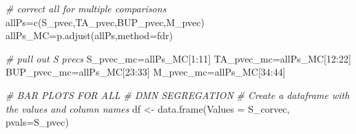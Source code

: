 \documentclass[
]{article}
\newenvironment{Shaded}{\begin{snugshade}}{\end{snugshade}}
\newcommand{\AttributeTok}[1]{\textcolor[rgb]{0.77,0.63,0.00}{#1}}
\newcommand{\CommentTok}[1]{\textcolor[rgb]{0.56,0.35,0.01}{\textit{#1}}}
\newcommand{\DecValTok}[1]{\textcolor[rgb]{0.00,0.00,0.81}{#1}}
\newcommand{\FunctionTok}[1]{\textcolor[rgb]{0.00,0.00,0.00}{#1}}
\newcommand{\NormalTok}[1]{#1}
\newcommand{\OtherTok}[1]{\textcolor[rgb]{0.56,0.35,0.01}{#1}}
\newcommand{\SpecialCharTok}[1]{\textcolor[rgb]{0.00,0.00,0.00}{#1}}
\newcommand{\StringTok}[1]{\textcolor[rgb]{0.31,0.60,0.02}{#1}}
\begin{document}
\begin{Shaded}
\begin{Highlighting}[]
\CommentTok{\# correct all for multiple comparisons}
\NormalTok{allPs}\OtherTok{=}\FunctionTok{c}\NormalTok{(S\_pvec,TA\_pvec,BUP\_pvec,M\_pvec)}
\NormalTok{allPs\_MC}\OtherTok{=}\FunctionTok{p.adjust}\NormalTok{(allPs,}\AttributeTok{method=}\StringTok{\textquotesingle{}fdr\textquotesingle{}}\NormalTok{)}

\CommentTok{\# pull out S pvecs}
\NormalTok{S\_pvec\_mc}\OtherTok{=}\NormalTok{allPs\_MC[}\DecValTok{1}\SpecialCharTok{:}\DecValTok{11}\NormalTok{]}
\NormalTok{TA\_pvec\_mc}\OtherTok{=}\NormalTok{allPs\_MC[}\DecValTok{12}\SpecialCharTok{:}\DecValTok{22}\NormalTok{]}
\NormalTok{BUP\_pvec\_mc}\OtherTok{=}\NormalTok{allPs\_MC[}\DecValTok{23}\SpecialCharTok{:}\DecValTok{33}\NormalTok{]}
\NormalTok{M\_pvec\_mc}\OtherTok{=}\NormalTok{allPs\_MC[}\DecValTok{34}\SpecialCharTok{:}\DecValTok{44}\NormalTok{]}

\CommentTok{\# BAR PLOTS FOR ALL}
\CommentTok{\# DMN SEGREGATION}
\CommentTok{\# Create a dataframe with the values and column names}
\NormalTok{df }\OtherTok{\textless{}{-}} \FunctionTok{data.frame}\NormalTok{(}\AttributeTok{Values =}\NormalTok{ S\_corvec, }\AttributeTok{pvals=}\NormalTok{S\_pvec)}


\end{Highlighting}
\end{Shaded}
\end{document}
